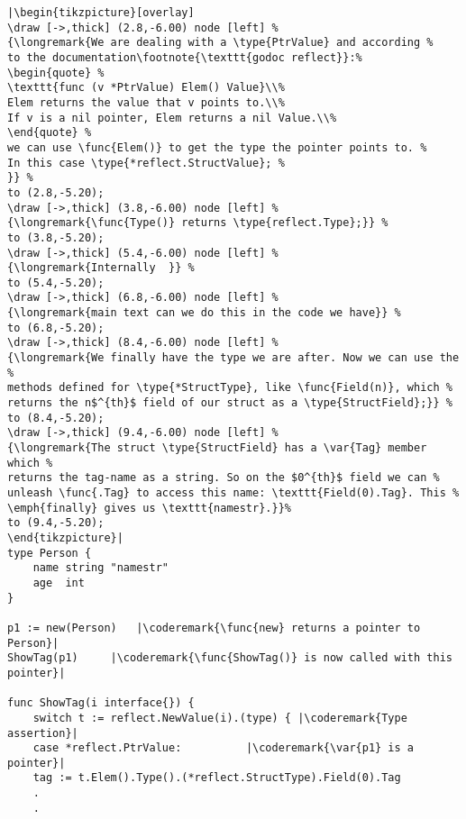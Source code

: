 \begin{lstlisting}[caption=Introspection using reflection,label=src:introspection]
|\begin{tikzpicture}[overlay]
\draw [->,thick] (2.8,-6.00) node [left] %
{\longremark{We are dealing with a \type{PtrValue} and according %
to the documentation\footnote{\texttt{godoc reflect}}:%
\begin{quote} %
\texttt{func (v *PtrValue) Elem() Value}\\%
Elem returns the value that v points to.\\%
If v is a nil pointer, Elem returns a nil Value.\\%
\end{quote} %
we can use \func{Elem()} to get the type the pointer points to. %
In this case \type{*reflect.StructValue}; %
}} %
to (2.8,-5.20);
\draw [->,thick] (3.8,-6.00) node [left] %
{\longremark{\func{Type()} returns \type{reflect.Type};}} %
to (3.8,-5.20);
\draw [->,thick] (5.4,-6.00) node [left] %
{\longremark{Internally  }} %
to (5.4,-5.20);
\draw [->,thick] (6.8,-6.00) node [left] %
{\longremark{main text can we do this in the code we have}} %
to (6.8,-5.20);
\draw [->,thick] (8.4,-6.00) node [left] %
{\longremark{We finally have the type we are after. Now we can use the %
methods defined for \type{*StructType}, like \func{Field(n)}, which %
returns the n$^{th}$ field of our struct as a \type{StructField};}} %
to (8.4,-5.20);
\draw [->,thick] (9.4,-6.00) node [left] %
{\longremark{The struct \type{StructField} has a \var{Tag} member which %
returns the tag-name as a string. So on the $0^{th}$ field we can %
unleash \func{.Tag} to access this name: \texttt{Field(0).Tag}. This %
\emph{finally} gives us \texttt{namestr}.}}%
to (9.4,-5.20);
\end{tikzpicture}|
type Person {
    name string "namestr"
    age  int
}

p1 := new(Person)   |\coderemark{\func{new} returns a pointer to Person}|
ShowTag(p1)	    |\coderemark{\func{ShowTag()} is now called with this pointer}|

func ShowTag(i interface{}) {
    switch t := reflect.NewValue(i).(type) { |\coderemark{Type assertion}|
    case *reflect.PtrValue:		     |\coderemark{\var{p1} is a pointer}|
	tag := t.Elem().Type().(*reflect.StructType).Field(0).Tag
	.
	.
\end{lstlisting}
